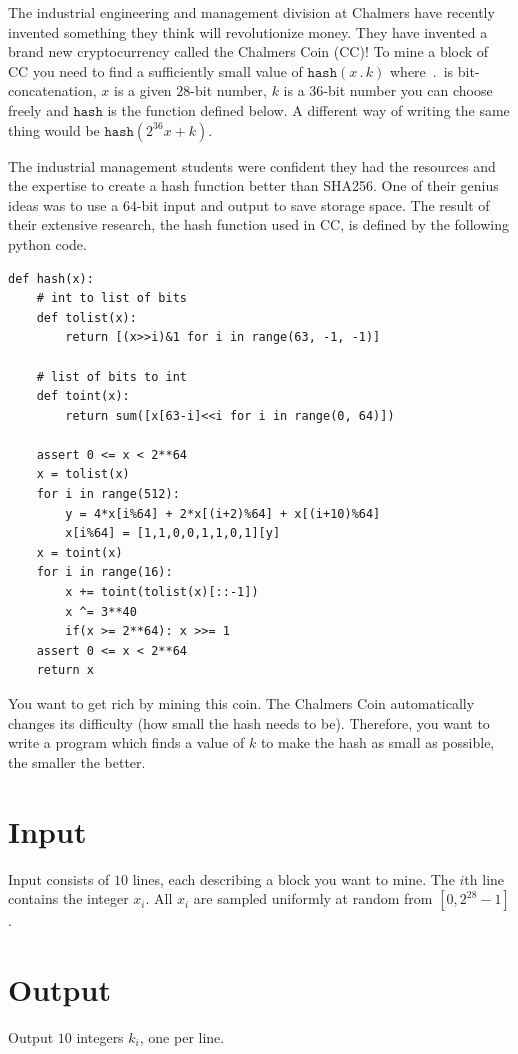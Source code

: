 The industrial engineering and management division at Chalmers have recently
invented something they think will revolutionize money. They have invented a
brand new cryptocurrency called the Chalmers Coin (CC)! To mine a block of CC
you need to find a sufficiently small value of $\texttt{hash}(x \,.\, k)$ where
$\,.\,$ is bit-concatenation, $x$ is a given $28$-bit number, $k$ is a $36$-bit
number you can choose freely and $\texttt{hash}$ is the function defined below.
A different way of writing the same thing would be $\texttt{hash}(2^{36} x +
k)$.

The industrial management students were confident they had the resources and the
expertise to create a hash function better than SHA256.  One of their genius
ideas was to use a $64$-bit input and output to save storage space. The result
of their extensive research, the hash function used in CC, is defined by the
following python code.

\begin{verbatim}
def hash(x):
    # int to list of bits
    def tolist(x):
        return [(x>>i)&1 for i in range(63, -1, -1)]

    # list of bits to int
    def toint(x):
        return sum([x[63-i]<<i for i in range(0, 64)])

    assert 0 <= x < 2**64
    x = tolist(x)
    for i in range(512):
        y = 4*x[i%64] + 2*x[(i+2)%64] + x[(i+10)%64]
        x[i%64] = [1,1,0,0,1,1,0,1][y]
    x = toint(x)
    for i in range(16):
        x += toint(tolist(x)[::-1])
        x ^= 3**40
        if(x >= 2**64): x >>= 1
    assert 0 <= x < 2**64
    return x
\end{verbatim}

\noindent You want to get rich by mining this coin. The Chalmers Coin
automatically changes its difficulty (how small the hash needs to be).
Therefore, you want to write a program which finds a value of $k$ to make the
hash as small as possible, the smaller the better.

\section*{Input}
Input consists of $10$ lines, each describing a block you want to mine. The
$i$th line contains the integer $x_i$. All $x_i$ are sampled uniformly at random
from $[0, 2^{28}-1]$.

\section*{Output}
Output $10$ integers $k_i$, one per line.

